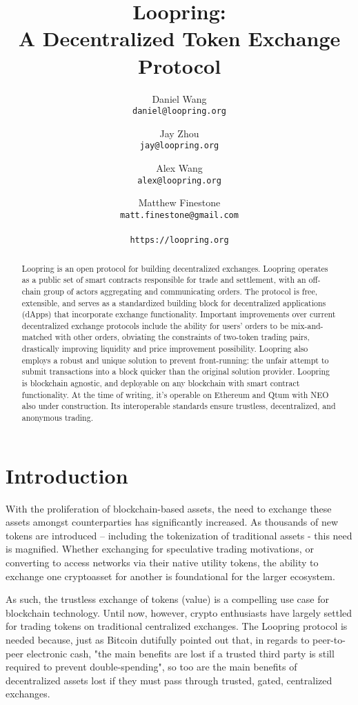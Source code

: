 \documentclass[UTF8,nofonts]{article}
\title{\textbf{Loopring:}\\\textbf{A Decentralized Token Exchange Protocol}}
\author{
  Daniel Wang\\
  \texttt{daniel@loopring.org}\\
  \and
  	Jay Zhou\\
  	\texttt{jay@loopring.org}\\
  	\and
  	Alex Wang\\
  	\texttt{alex@loopring.org}\\
  	\and
  	Matthew Finestone\\
  	\texttt{matt.finestone@gmail.com}\\ 
  \\
  \texttt{https://loopring.org}
 }
\begin{document}
\maketitle


\begin{abstract}
Loopring is an open protocol for building decentralized exchanges. Loopring operates as a public set of smart contracts responsible for trade and settlement, with an off-chain group of actors aggregating and communicating orders. The protocol is free, extensible, and serves as a standardized building block for decentralized applications (dApps) that incorporate exchange functionality. Important improvements over current decentralized exchange protocols include the ability for users' orders to be mix-and-matched with other orders, obviating the constraints of two-token trading pairs, drastically improving liquidity and price improvement possibility. Loopring also employs a robust and unique solution to prevent front-running: the unfair attempt to submit transactions into a block quicker than the original solution provider. Loopring is blockchain agnostic, and deployable on any blockchain with smart contract functionality. At the time of writing, it's operable on Ethereum \cite{buterin2017ethereum} \cite{wood2014ethereum} and Qtum \cite{dai2017smart} with NEO \cite{atterlonn2018distributed} also under construction. Its interoperable standards ensure trustless, decentralized, and anonymous trading. 
\end{abstract}




\section{Introduction\label{sec:introduction}}

With the proliferation of blockchain-based assets, the need to exchange these assets amongst counterparties has significantly increased. As thousands of new tokens are introduced -- including the tokenization of traditional assets - this need is magnified. Whether exchanging for speculative trading motivations, or converting to access networks via their native utility tokens, the ability to exchange one cryptoasset for another is foundational for the larger ecosystem.
 
As such, the trustless exchange of tokens (value) is a compelling use case for blockchain technology. Until now, however, crypto enthusiasts have largely settled for trading tokens on traditional centralized exchanges. The Loopring protocol is needed because, just as Bitcoin \cite{nakamoto2008bitcoin} dutifully pointed out that, in regards to peer-to-peer electronic cash, "the main benefits are lost if a trusted third party is still required to prevent double-spending", so too are the main benefits of decentralized assets lost if they must pass through trusted, gated, centralized exchanges.
\end{document}

